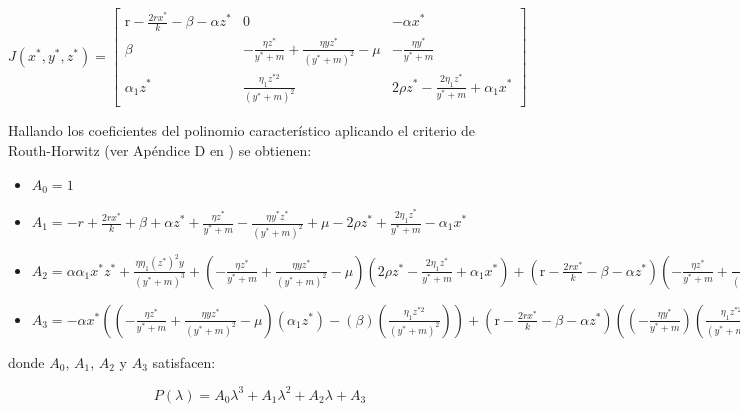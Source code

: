 \documentclass{wscpaperproc}
\theoremstyle{wsc}
\begin{document}
\begin{equation} \label{CharacteristicPolynomial}
	J\left(x^*, y^*, z^*\right)=\left[\begin{array}{ccc}
			\mathrm{r}-\frac{2 r x^*}{k}-\beta-\alpha z^* & 0                                                                   & -\alpha x^*                                     \\
			\beta                                         & -\frac{\eta z^*}{y^*+m}+\frac{\eta y z^*}{\left(y^*+m\right)^2}-\mu & -\frac{\eta y^*}{y^*+m}                         \\
			\alpha_1 z^*                                  & \frac{\eta_1 z^{* 2}}{\left(y^*+m\right)^2}                         & 2 \rho z^*-\frac{2 \eta_1 z^*}{y^*+m}+\alpha_1 x^*
		\end{array}\right]
\end{equation}

Hallando los coeficientes del polinomio característico aplicando el criterio de Routh-Horwitz (ver Apéndice D en \cite{castellanos_existence_2017}) se obtienen:


\begin{itemize}
	\item[] $A_0 = 1$

	\item[] $A_1 = -r + \frac{2rx^*}{k} + \beta + \alpha z^*  + \frac{\eta z^*}{y^*+m} - \frac{\eta y^*z^*}{(y^*+m)^2} + \mu - 2 \rho z^* + \frac{2\eta_1 z^*}{y^*+m} - \alpha_1 x^*$

	\item[] $A_2 = \alpha \alpha_1 x^* z^* + \frac{\eta \eta_1 (z^*)^{2} y}{(y^*+m)^3} + (-\frac{\eta z^*}{y^*+m}+\frac{\eta y z^*}{(y^*+m)^2}-\mu )(2 \rho z^*-\frac{2 \eta_1 z^*}{y^*+m}+\alpha_1 x^*) + (\mathrm{r}-\frac{2 r x^*}{k}-\beta-\alpha z^*)(-\frac{\eta z^*}{y^*+m}+\frac{\eta y z^*}{(y^*+m)^2}-\mu +2 \rho z^*-\frac{2 \eta_1 z^*}{y^*+m}+\alpha_1 x^*)$

	\item[] $A_3 = -\alpha x^* ((-\frac{\eta z^*}{y^*+m}+\frac{\eta y z^*}{(y^*+m)^2}-\mu)(\alpha_1 z^* ) - (\beta) (\frac{\eta_1 z^{* 2}}{(y^*+m)^2}) ) + (\mathrm{r}-\frac{2 r x^*}{k}-\beta-\alpha z^*) ((-\frac{\eta y^*}{y^*+m} )(\frac{\eta_1 z^{* 2}}{(y^*+m)^2}) - (-\frac{\eta z^*}{y^*+m}+\frac{\eta y z^*}{(y^*+m)^2}-\mu)(2 \rho z^*-\frac{2 \eta_1 z^*}{y^*+m}+\alpha_1 x^*))	$
	
\end{itemize}
donde $A_0$, $A_1$, $A_2$  y $A_3$ satisfacen:

$$P(\lambda) = A_0\lambda^3 + A_1\lambda^2 + A_2\lambda + A_3$$
\end{document}
